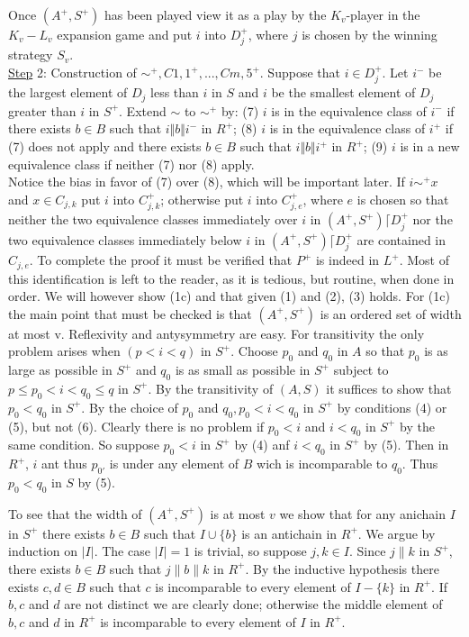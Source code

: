 \documentclass[twoside]{article}
\begin{document}
Once $(A^+,S^+)$   has been played view it as a play by the   $K_v$-player in the $K_v-L_v$ expansion game and put   $i$ into   $D_j^+$, where   $j$    is   chosen by the winning strategy $S_v$.\\
\newline
\underline{Step} 2:   Construction of  $\sim^+, C{1,1}^+,...,C{m,5}^+$.  Suppose that $i\in D_j^+$.   Let   $i^-$ be
the largest element of   $D_j$    less than   $i$ in   $S$     and   $i$     be the smallest
element of	$D_j$ greater than   $i$   in   $S^+$.   Extend  $\sim$   to  $\sim^+$ by:
(7) $i$    is	in the equivalence class of   $i^-$   if there   exists   $b \in B$ such
that	$i\Vert b\Vert i^-$   in $R^+$;
(8) $i$    is	in the equivalence class of   $i^+$   if   (7)   does not apply and
there	exists   $b \in B$   such that $i\Vert b\Vert i^+$   in $R^+$;
(9) $i$   is	in a new equivalence class if neither (7) nor   (8) apply.\\


Notice the bias in favor of   (7)   over   (8), which will be important
later.    If   $i\sim^+ x$   and   $x\in C_{j,k}$   put   $i$ into   $C_{j,k}^+$;   otherwise put   $i$ into
$C_{j,e}^+$, where	$e$ is chosen so that neither the two equivalence classes
immediately	over   $i$   in   $(A^+,S^+)\lceil D_{j}^+$ nor the two equivalence classes
immediately	below   $i$   in   $(A^+,S^+)\lceil D_j^+$  are contained in   $C_{j,e}$.
%
%
To complete the proof it must be verified that $P^+$ is indeed in $L^+$.
Most of this identification is left to the reader, as it is tedious, but routine, when done in order. We will however show (1c)
and that given (1) and (2), (3) holds. For (1c) the main point that must be checked is that $(A^+, S^+)$ is an ordered set of width at most v.
Reflexivity and antysymmetry are easy. For transitivity the only problem arises when $(p < i < q)$ in $S^+$.
Choose $p_0$ and $q_0$ in $A$ so that $p_0$ is as large as possible in $S^+$ and $q_0$ is as small as possible in $S^+$ subject to
$p \leq p_0 < i < q_0 \leq q$ in $S^+$. By the transitivity of $(A,S)$ it suffices to show that $p_0 < q_0$ in $S^+$. By the choice of 
$p_0$ and $q_0, p_0 <i <q_0$ in $S^+$ by conditions (4) or (5), but not (6). Clearly there is no problem if $p_0 < i$ and $i < q_0$ in $S^+$
by the same condition. So suppose $p_0 <i$ in $S^+$ by (4) anf $i < q_0$ in $S^+$ by (5). Then in $R^+$, $i$ ant thus $p_{0'}$ is under any
element of $B$ wich is incomparable to $q_0$. Thus $p_0<q_0$ in $S$ by (5).

To see that the width of $(A^+, S^+)$ is at most $v$ we show that for any anichain $I$ in $S^+$ there exists $b \in B$ such that $I \cup \{b\}$
is an antichain in $R^+$. We argue by induction on $|I|$. The case $|I| = 1$ is trivial, so suppose $j,k \in I$. Since $j\parallel k$ in $S^+$,
there exists $b \in B$ such that $j \parallel b \parallel k$ in $R^+$. By the inductive hypothesis there exists $c,d \in B$ such that $c$ is 
incomparable to every element of $I-\{k\}$ in $R^+$. If $b,c$ and $d$ are not distinct we are clearly done; otherwise the middle element
of $b,c$ and $d$ in $R^+$ is incomparable to every element of $I$ in $R^+$.
\end{document}
